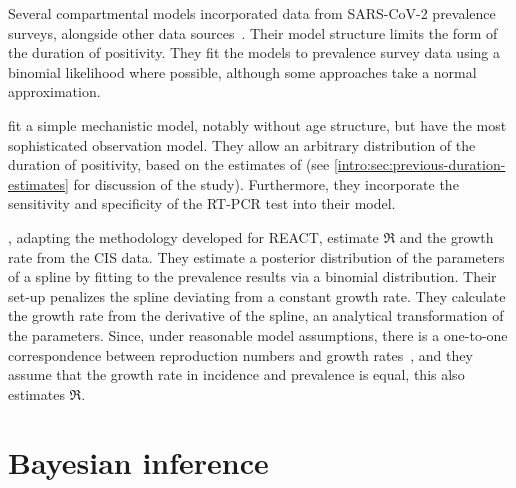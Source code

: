 \documentclass[thesis.tex]{subfiles}
\begin{document}
Several compartmental models incorporated data from SARS-CoV-2 prevalence surveys, alongside other data sources~\autocite{daviesAssociation,ironsEstimating,knockKey,nicholsonImproving,pooleyEstimation,birrellRTM2}.
Their model structure limits the form of the duration of positivity. 
They fit the models to prevalence survey data using a binomial likelihood where possible, although some approaches take a normal approximation.

\Textcite{nicholsonImproving} fit a simple mechanistic model, notably without age structure, but have the most sophisticated observation model.
They allow an arbitrary distribution of the duration of positivity, based on the estimates of \textcite{hellewellPCRSensitivity} (see \cref{intro:sec:previous-duration-estimates} for discussion of the \textcite{hellewellPCRSensitivity} study).
Furthermore, they incorporate the sensitivity and specificity of the RT-PCR test into their model.

\Textcite{mccabeCISincidence}, adapting the methodology \textcite{ealesAppropriately} developed for REACT, estimate $\Re$ and the growth rate from the CIS data.
They estimate a posterior distribution of the parameters of a spline by fitting to the prevalence results via a binomial distribution.
Their set-up penalizes the spline deviating from a constant growth rate.
They calculate the growth rate from the derivative of the spline, an analytical transformation of the parameters. 
Since, under reasonable model assumptions, there is a one-to-one correspondence between reproduction numbers and growth rates~\autocite{wallingaGI}, and they assume that the growth rate in incidence and prevalence is equal, this also estimates $\Re$.

\section{Bayesian inference} \label{intro:sec:Bayes}
\end{document}
